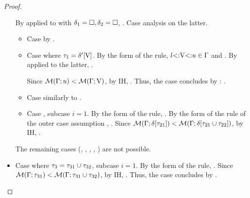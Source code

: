 \begin{proof}
\begin{itemize}
            By  applied to
            with $\delta_1=\square,\delta_2=\square$,
            .
            Case analysis on the latter.
            \begin{itemize}
                \item Case  by .
                \item Case  where $\tau_1 = \delta'[\mathrm{V}]$.
                    By the form of the rule, $l{\operatorname{<:}}\mathrm{V}{\operatorname{<:}}u \in \Gamma$ and
                    {}.
                    By  applied to the latter,
                    {\plug{}}.

                    Since $\operatorname{\mathcal{M}}(\Gamma;u) < \operatorname{\mathcal{M}}(\Gamma;\mathrm{V})$, by IH,
                    .
                    Thus, the case concludes by :
                    .
                \item Case  similarly to .
                \item Case , subcase $i=1$.
                    By the form of the rule, .
                    By the form of the rule of the outer case assumption
                    ,
                    .
                    Since $\operatorname{\mathcal{M}}(\Gamma;\delta[\tau_{21}]) < 
                    \operatorname{\mathcal{M}}(\Gamma;\delta[\tau_{21} \cup \tau_{22}])$,
                    by IH, .
            \end{itemize}
            The remaining cases
            (, , , , ) 
            are not possible.
        \item Case  
             where 
            $\tau_3 = \tau_{31} \cup \tau_{32}$, subcase $i=1$.
            By the form of the rule, . Since
            $\operatorname{\mathcal{M}}(\Gamma;\tau_{31}) < \operatorname{\mathcal{M}}(\Gamma;\tau_{31} \cup \tau_{32})$,
            by IH, .
            Thus, the case concludes by .
    \end{itemize}
\end{proof}

